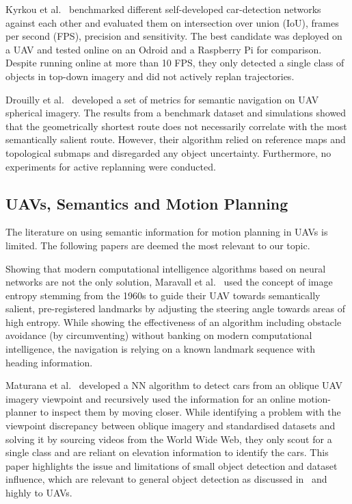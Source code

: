 \documentclass[a4paper,11pt]{article}
\theoremstyle{mytheor}
\begin{document}
Kyrkou et al.~\cite{kyrkou_dronet:_2018} benchmarked different self-developed car-detection networks against each other and evaluated them on intersection over union (IoU), frames per second (FPS), precision and sensitivity. The best candidate was deployed on a UAV and tested online on an Odroid and a Raspberry Pi for comparison. Despite running online at more than 10 FPS, they only detected a single class of objects in top-down imagery and did not actively replan trajectories.

Drouilly et al.~\cite{drouilly_semantic_2015} developed a set of metrics for semantic navigation on UAV spherical imagery. The results from a benchmark dataset and simulations showed that the geometrically shortest route does not necessarily correlate with the most semantically salient route. However, their algorithm relied on reference maps and topological submaps and disregarded any object uncertainty. Furthermore, no experiments for active replanning were conducted.

\subsection{UAVs, Semantics and Motion Planning} \label{subsec:LitUAVSemActive}
The literature on using semantic information for motion planning in UAVs is limited. The following papers are deemed the most relevant to our topic.

Showing that modern computational intelligence algorithms based on neural networks are not the only solution, Maravall et al.~\cite{maravall_navigation_2017} used the concept of image entropy stemming from the 1960s to guide their UAV towards semantically salient, pre-registered landmarks by adjusting the steering angle towards areas of high entropy. While showing the effectiveness of an algorithm including obstacle avoidance (by circumventing) without banking on modern computational intelligence, the navigation is relying on a known landmark sequence with heading information.

Maturana et al.~\cite{maturana_looking_2017} developed a NN algorithm to detect cars from an oblique UAV imagery viewpoint and recursively used the information for an online motion-planner to inspect them by moving closer. While identifying a problem with the viewpoint discrepancy between oblique imagery and standardised datasets and solving it by sourcing videos from the World Wide Web, they only scout for a single class and are reliant on elevation information to identify the cars. This paper highlights the issue and limitations of small object detection and dataset influence, which are relevant to general object detection as discussed in~\cite{liu_deep_2019} and highly to UAVs.
\end{document}

